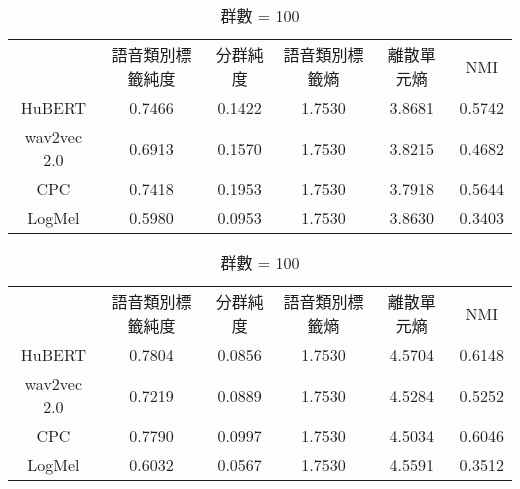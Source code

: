         \begin{table}[!htbp]
            \centering
            \begin{subtable}[t]{\textwidth}
                \centering
                \begin{tabular}{cccccc}
                                & 語音類別標籤純度 & 分群純度 & 語音類別標籤熵 & 離散單元熵 &     NMI \\
                    HuBERT      &           0.7466 &   0.1422 &         1.7530 &     3.8681 &  0.5742 \\   %
                    wav2vec 2.0 &           0.6913 &   0.1570 &         1.7530 &     3.8215 &  0.4682 \\   %
                    CPC         &           0.7418 &   0.1953 &         1.7530 &     3.7918 &  0.5644 \\   %
                    LogMel      &           0.5980 &   0.0953 &         1.7530 &     3.8630 &  0.3403 \\   %
                \end{tabular}
                \caption{群數 = 50}
                \label{tab:ch3-clu050}
            \end{subtable}        

            \vspace{0.5cm}        

            \begin{subtable}[t]{\textwidth}
                \centering
                \begin{tabular}{cccccc}
                                & 語音類別標籤純度 & 分群純度 & 語音類別標籤熵 & 離散單元熵 &     NMI \\
                    HuBERT      &           0.7804 &   0.0856 &         1.7530 &     4.5704 &  0.6148 \\   %
                    wav2vec 2.0 &           0.7219 &   0.0889 &         1.7530 &     4.5284 &  0.5252 \\   %
                    CPC         &           0.7790 &   0.0997 &         1.7530 &     4.5034 &  0.6046 \\   %
                    LogMel      &           0.6032 &   0.0567 &         1.7530 &     4.5591 &  0.3512 \\   %
                \end{tabular}
                \caption{群數 = 100}
                \label{tab:ch3-clu100}
            \end{subtable}        


\end{table}
